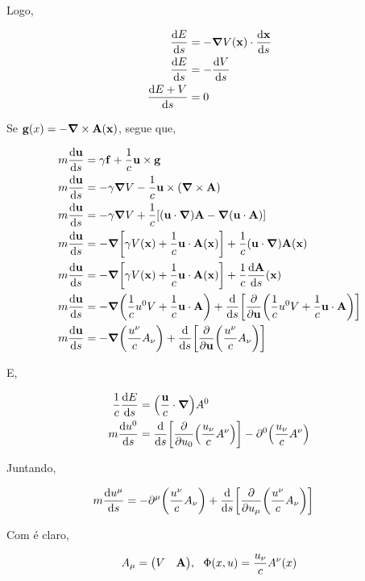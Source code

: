 \documentclass[twoside]{amsart}
\numberwithin{equation}{section}
\begin{document}
Logo, 

\begin{align}
    \dv{E}{s}&=-\grad V\qty(\vb x)\cdot\dv{\vb x}{s}\\
    \dv{E}{s}&=-\dv{V}{s}\\
    \dv{E+V}{s}&=0
\end{align}

Se $\vb g\qty(x)=-\grad\times \vb A\qty(\vb x)$, segue que,

\begin{align}
    m\dv{\vb u}{s}&=\gamma\vb f+\frac1c\vb u\times\vb g\\
    m\dv{\vb u}{s}&=-\gamma\grad V-\frac1c\vb u\times\qty(\grad\times \vb A)\\
    m\dv{\vb u}{s}&=-\gamma\grad V+\frac1c\qty[\qty(\vb u\cdot\grad) \vb A-\grad\qty(\vb u\cdot \vb A)]\\
    m\dv{\vb u}{s}&=-\grad \qty[\gamma V\qty(\vb x)+\frac1c\vb u\cdot \vb A\qty(\vb x)]+\frac1c\qty(\vb u\cdot\grad) \vb A\qty(\vb x)\\
    m\dv{\vb u}{s}&=-\grad \qty[\gamma V\qty(\vb x)+\frac1c\vb u\cdot \vb A\qty(\vb x)]+\frac1c\dv{\vb A}{s}\qty(\vb x)\\
    m\dv{\vb u}{s}&=-\grad \qty(\frac1cu^0 V+\frac1c\vb u\cdot \vb A)+\dv{}{s}\qty[\pdv{}{\vb u}\qty(\frac1cu^0V+\frac1c\vb u\cdot \vb A)]\\
    m\dv{\vb u}{s}&=-\grad\qty( \frac{u^\nu}{c} A_\nu)+\dv{}{s}\qty[\pdv{}{\vb u}\qty(\frac{u^\nu}{c} A_\nu)]
\end{align}

E,

\begin{align}
    \frac1c\dv{E}{s}&=\qty(\frac{\vb u}{c}\cdot \grad)A^0\\
    m\dv{u^0}{s}&=\dv{}{s}\qty[\pdv{}{u_0}\qty(\frac{u_\nu}{c} A^\nu)]-\partial^0\qty(\frac{u_\nu}{c} A^\nu)
\end{align}

Juntando,

\begin{align}
    m\dv{u^\mu}{s}&=-\partial^\mu\qty(\frac{u^\nu}{c} A_\nu)+\dv{}{s}\qty[\pdv{}{u_\mu}\qty(\frac{u^\nu}{c} A_\nu)]
\end{align}

Com é claro,

\begin{align}
    A_\mu=\mqty( V&\vb A),\ \ \Phi\qty(x,u)=\frac{u_\nu}{c} A^\nu\qty(x)
\end{align}
\end{document}
